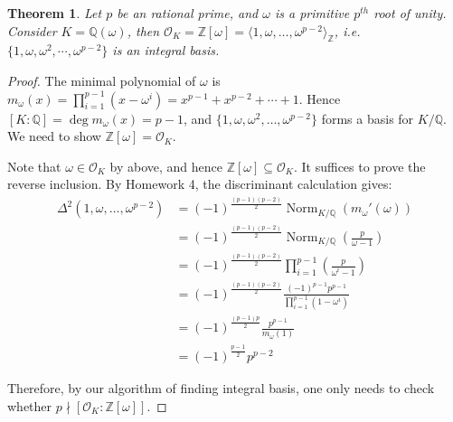 \documentclass[11pt]{book}
\newtheorem{theorem}{Theorem}[section]
\begin{document}
\begin{theorem}
    Let $p$ be an rational prime, and $\omega$ is a primitive $p^{th}$ root of unity. Consider $K=\mathbb{Q(\omega)}$, then $\mathcal{O}_K=\mathbb{Z}[\omega] = \langle 1, \omega, \dots, \omega^{p-2} \rangle_{\mathbb{Z}}$, i.e. $\{1,\omega,\omega^2,\cdots,\omega^{p-2}\}$ is an integral basis.

\end{theorem}
\begin{proof}
The minimal polynomial of $\omega$ is
$
m_\omega(x) = \prod_{i=1}^{p-1}(x-\omega^i) =x^{p-1} + x^{p-2} + \cdots + 1
.$ 
Hence $[K:\mathbb{Q}] = \deg m_\omega(x) = p-1$, and $\{1, \omega, \omega^2, \dotsc, \omega^{p-2}\}$ forms a basis for $K/\mathbb{Q}$. We need to show $\mathbb{Z}[\omega] = \mathcal{O}_K$. 

Note that $\omega \in \mathcal{O}_K$ by above, and hence $\mathbb{Z}[\omega] \subseteq \mathcal{O}_K$. It suffices to prove the reverse inclusion. By Homework 4, the discriminant calculation gives:
\begin{align*}
\Delta^2(1, \omega, \dotsc, \omega^{p-2}) &= (-1)^{\frac{(p-1)(p-2)}{2}} \operatorname{Norm}_{K/\mathbb{Q}}(m_\omega'(\omega)) \\
&= (-1)^{\frac{(p-1)(p-2)}{2}} \operatorname{Norm}_{K/\mathbb{Q}}\left(\frac{p}{\omega - 1}\right) \\
&= (-1)^{\frac{(p-1)(p-2)}{2}} \prod_{i=1}^{p-1}\left(\frac{p}{\omega^{i} - 1}\right) \\
&= (-1)^{\frac{(p-1)(p-2)}{2}} \frac{(-1)^{p-1}p^{p-1}}{\prod_{i=1}^{p-1}\left({1-\omega^{i}}\right)} \\
&= (-1)^{\frac{(p-1)p}{2}} \frac{p^{p-1}}{m_{\omega}(1)} \\
&= (-1)^{\frac{p-1}{2}} p^{p-2}
\end{align*}

Therefore, by our algorithm of finding integral basis, one only needs to check whether $p \nmid [\mathcal{O}_K: \mathbb{Z}[\omega]]$.


\end{proof}
\end{document}

